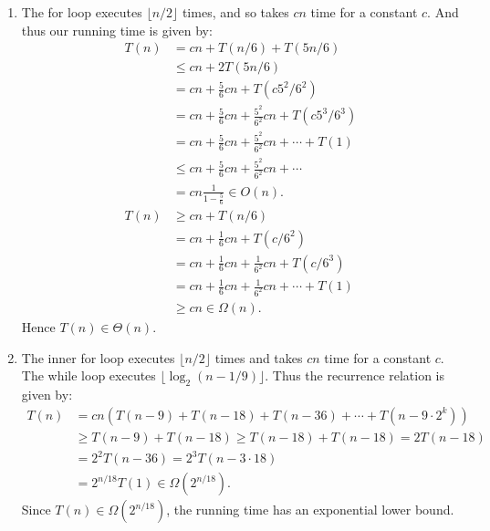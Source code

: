 \documentclass[10pt,oneside,reqno]{amsart}
\theoremstyle{plain}
\theoremstyle{definition}
\begin{document}
\begin{enumerate}[label=\arabic*.]
\item The for loop executes $\lfloor n/2 \rfloor$ times, and so takes $cn$ time for a constant $c$. And thus our running time is given by:
\begin{equation}
\begin{aligned}
T(n) &= cn + T(n/6) + T(5n/6)\\
&\leq cn  + 2T(5n/6)\\
&= cn + \frac{5}{6}cn + T(c5^2/6^2)\\
&= cn + \frac{5}{6}cn + \frac{5^2}{6^2}cn + T(c5^3/6^3)\\
&= cn + \frac{5}{6}cn + \frac{5^2}{6^2}cn + \cdots + T(1)\\
&\leq cn + \frac{5}{6}cn + \frac{5^2}{6^2}cn + \cdots\\
&= cn \frac{1}{1 - \frac{5}{6}} \in O(n). \\
T(n) &\geq cn + T(n/6)\\
&= cn + \frac{1}{6}cn + T(c/6^2)\\
&= cn + \frac{1}{6}cn + \frac{1}{6^2}cn + T(c/6^3)\\
&= cn + \frac{1}{6}cn + \frac{1}{6^2}cn + \cdots + T(1)\\
&\geq cn \in \Omega(n). 
\end{aligned}
\end{equation}
Hence $T(n) \in \Theta(n)$. \\

\item The inner for loop executes $\lfloor n/2 \rfloor$ times and takes $cn$ time for a constant $c$. The while loop executes $\lfloor \log_2(n-1/9)\rfloor$. Thus the recurrence relation is given by:
\begin{equation}
\begin{aligned}
T(n) &= cn \left(T(n - 9) + T(n - 18) + T(n - 36) + \cdots + T(n - 9 \cdot 2^k) \right)\\
&\geq T(n - 9) + T(n - 18) \geq T(n - 18) + T(n - 18) = 2T(n - 18)\\
&= 2^2T(n - 36) = 2^3T(n - 3 \cdot 18)\\
&= 2^{n/18}T(1) \in \Omega(2^{n/18}). 
\end{aligned}
\end{equation}
Since $T(n) \in \Omega(2^{n/18})$, the running time has an exponential lower bound. \\



\end{enumerate}
\end{document}
